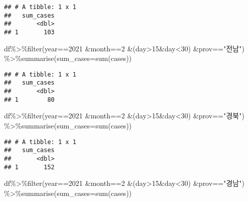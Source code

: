 \documentclass[
]{article}
\newenvironment{Shaded}{\begin{snugshade}}{\end{snugshade}}
\newcommand{\AttributeTok}[1]{\textcolor[rgb]{0.77,0.63,0.00}{#1}}
\newcommand{\DecValTok}[1]{\textcolor[rgb]{0.00,0.00,0.81}{#1}}
\newcommand{\FunctionTok}[1]{\textcolor[rgb]{0.00,0.00,0.00}{#1}}
\newcommand{\NormalTok}[1]{#1}
\newcommand{\SpecialCharTok}[1]{\textcolor[rgb]{0.00,0.00,0.00}{#1}}
\newcommand{\StringTok}[1]{\textcolor[rgb]{0.31,0.60,0.02}{#1}}
\begin{document}
\begin{verbatim}
## # A tibble: 1 x 1
##   sum_cases
##       <dbl>
## 1       103
\end{verbatim}

\begin{Shaded}
\begin{Highlighting}[]
\NormalTok{df}\SpecialCharTok{\%\textgreater{}\%}\FunctionTok{filter}\NormalTok{(year}\SpecialCharTok{==}\DecValTok{2021} \SpecialCharTok{\&}\NormalTok{month}\SpecialCharTok{==}\DecValTok{2} \SpecialCharTok{\&}\NormalTok{(day}\SpecialCharTok{\textgreater{}}\DecValTok{15}\SpecialCharTok{\&}\NormalTok{day}\SpecialCharTok{\textless{}}\DecValTok{30}\NormalTok{) }\SpecialCharTok{\&}\NormalTok{prov}\SpecialCharTok{==}\StringTok{"전남"}\NormalTok{) }\SpecialCharTok{\%\textgreater{}\%}\FunctionTok{summarise}\NormalTok{(}\AttributeTok{sum\_cases=}\FunctionTok{sum}\NormalTok{(cases))}
\end{Highlighting}
\end{Shaded}

\begin{verbatim}
## # A tibble: 1 x 1
##   sum_cases
##       <dbl>
## 1        80
\end{verbatim}

\begin{Shaded}
\begin{Highlighting}[]
\NormalTok{df}\SpecialCharTok{\%\textgreater{}\%}\FunctionTok{filter}\NormalTok{(year}\SpecialCharTok{==}\DecValTok{2021} \SpecialCharTok{\&}\NormalTok{month}\SpecialCharTok{==}\DecValTok{2} \SpecialCharTok{\&}\NormalTok{(day}\SpecialCharTok{\textgreater{}}\DecValTok{15}\SpecialCharTok{\&}\NormalTok{day}\SpecialCharTok{\textless{}}\DecValTok{30}\NormalTok{) }\SpecialCharTok{\&}\NormalTok{prov}\SpecialCharTok{==}\StringTok{"경북"}\NormalTok{) }\SpecialCharTok{\%\textgreater{}\%}\FunctionTok{summarise}\NormalTok{(}\AttributeTok{sum\_cases=}\FunctionTok{sum}\NormalTok{(cases))}
\end{Highlighting}
\end{Shaded}

\begin{verbatim}
## # A tibble: 1 x 1
##   sum_cases
##       <dbl>
## 1       152
\end{verbatim}

\begin{Shaded}
\begin{Highlighting}[]
\NormalTok{df}\SpecialCharTok{\%\textgreater{}\%}\FunctionTok{filter}\NormalTok{(year}\SpecialCharTok{==}\DecValTok{2021} \SpecialCharTok{\&}\NormalTok{month}\SpecialCharTok{==}\DecValTok{2} \SpecialCharTok{\&}\NormalTok{(day}\SpecialCharTok{\textgreater{}}\DecValTok{15}\SpecialCharTok{\&}\NormalTok{day}\SpecialCharTok{\textless{}}\DecValTok{30}\NormalTok{) }\SpecialCharTok{\&}\NormalTok{prov}\SpecialCharTok{==}\StringTok{"경남"}\NormalTok{) }\SpecialCharTok{\%\textgreater{}\%}\FunctionTok{summarise}\NormalTok{(}\AttributeTok{sum\_cases=}\FunctionTok{sum}\NormalTok{(cases))}
\end{Highlighting}
\end{Shaded}
\end{document}
